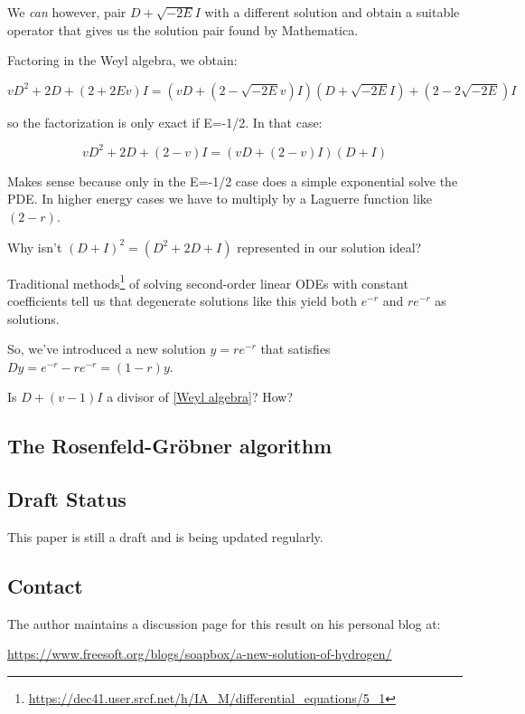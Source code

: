 \documentclass{article}
\begin{document}
We {\it can} however, pair $D+\sqrt{-2E}I$ with a different solution and obtain a suitable operator
that gives us the solution pair found by Mathematica.

Factoring in the Weyl algebra, we obtain:

\begin{equation}
vD^2 + 2D + (2+2Ev) I = (vD + (2-\sqrt{-2E}v)I) (D+\sqrt{-2E}I) + (2-2\sqrt{-2E})I
\end{equation}

so the factorization is only exact if E=-1/2.  In that case:

\begin{equation}
\label{Weyl algebra}
vD^2 + 2D + (2-v) I = (vD + (2-v)I) (D+I)
\end{equation}

Makes sense because only in the E=-1/2 case does a simple exponential solve the PDE.  In
higher energy cases we have to multiply by a Laguerre function like $(2-r)$.

Why isn't $(D+I)^2 = (D^2+2D+I)$ represented in our solution ideal?

Traditional methods\footnote{\url{https://dec41.user.srcf.net/h/IA_M/differential_equations/5_1}}
of solving second-order linear ODEs with constant coefficients tell us that degenerate
solutions like this yield both $e^{-r}$ and $re^{-r}$ as solutions.

So, we've introduced a new solution $y=re^{-r}$ that satisfies $Dy=e^{-r}-re^{-r}=(1-r)y$.

Is $D+(v-1)I$ a divisor of \eqref{Weyl algebra}?  How?

\subsection*{The Rosenfeld-Gr\"obner algorithm}

\subsection*{Draft Status}

This paper is still a draft and is being updated regularly.

\subsection*{Contact}

The author maintains a discussion page for this result on his personal blog at:

\begin{center}
\small
\url{https://www.freesoft.org/blogs/soapbox/a-new-solution-of-hydrogen/}
\end{center}
\end{document}
